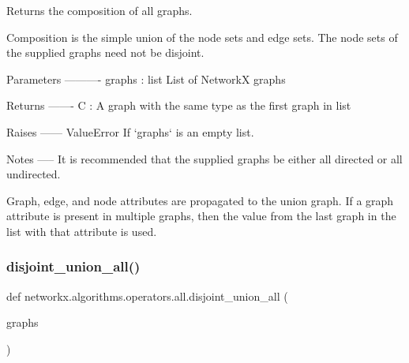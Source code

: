 \begin{DoxyVerb}Returns the composition of all graphs.

Composition is the simple union of the node sets and edge sets.
The node sets of the supplied graphs need not be disjoint.

Parameters
----------
graphs : list
   List of NetworkX graphs

Returns
-------
C : A graph with the same type as the first graph in list

Raises
------
ValueError
   If `graphs` is an empty list.

Notes
-----
It is recommended that the supplied graphs be either all directed or all
undirected.

Graph, edge, and node attributes are propagated to the union graph.
If a graph attribute is present in multiple graphs, then the value
from the last graph in the list with that attribute is used.
\end{DoxyVerb}
 \mbox{\label{namespacenetworkx_1_1algorithms_1_1operators_1_1all_a14b22d0f0f0cfb34074e57c5e71ca175}} 
\subsubsection{\texorpdfstring{disjoint\+\_\+union\+\_\+all()}{disjoint\_union\_all()}}
{\footnotesize\ttfamily def networkx.\+algorithms.\+operators.\+all.\+disjoint\+\_\+union\+\_\+all (\begin{DoxyParamCaption}\item[{}]{graphs }\end{DoxyParamCaption})}

